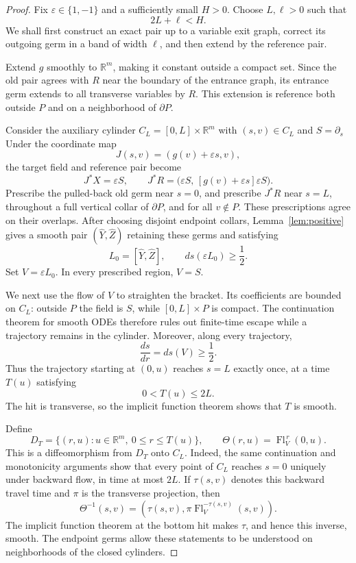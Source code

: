 \documentclass[11pt]{article}
\theoremstyle{remark}
\begin{document}
\begin{proof}
Fix $\varepsilon\in\{1,-1\}$ and a sufficiently small $H>0$. Choose $L,\ell>0$ such that
$$
    2L+\ell<H.
$$
We shall first construct an exact pair up to a variable exit graph, correct its outgoing germ in a band of width $\ell$, and then extend by the reference pair.

Extend $g$ smoothly to $\mathbb R^m$, making it constant outside a compact set. Since the old pair agrees with $R$ near the boundary of the entrance graph, its entrance germ extends to all transverse variables by $R$. This extension is reference both outside $P$ and on a neighborhood of $\partial P$.

Consider the auxiliary cylinder $C_L=[0,L]\times\mathbb R^m$ with $(s,v)\in C_L$ and $S=\partial_s$ Under the coordinate map
$$
    J(s,v)=(g(v)+\varepsilon s,v),
$$
the target field and reference pair become
$$
    J^*X=\varepsilon S,
    \qquad
    J^*R=
    \bigl(\varepsilon S,\,[g(v)+\varepsilon s]\varepsilon S\bigr).
$$
Prescribe the pulled-back old germ near $s=0$, and prescribe $J^*R$ near $s=L$, throughout a full vertical collar of $\partial P$, and for all $v\notin P$. These prescriptions agree on their overlaps. After choosing disjoint endpoint collars, Lemma~\ref{lem:positive} gives a smooth pair $(\widehat Y,\widehat Z)$ retaining these germs
and satisfying
$$
    L_0=[\widehat Y,\widehat Z],
    \qquad
    ds(\varepsilon L_0)\ge\frac12.
$$
Set $V=\varepsilon L_0$. In every prescribed region, $V=S$.

We next use the flow of $V$ to straighten the bracket. Its coefficients are bounded on $C_L$: outside $P$ the field is $S$, while $[0,L]\times P$ is compact. The continuation theorem for smooth ODEs therefore rules out finite-time escape while a trajectory remains in the cylinder. Moreover, along every trajectory,
$$
    \frac{ds}{dr}=ds(V)\ge\frac12.
$$
Thus the trajectory starting at $(0,u)$ reaches $s=L$ exactly once, at a time $T(u)$ satisfying
$$
    0<T(u)\le 2L.
$$
The hit is transverse, so the implicit function theorem shows that $T$ is smooth.

Define
$$
    D_T=
    \{(r,u):u\in\mathbb R^m,\ 0\le r\le T(u)\},
    \qquad
    \Theta(r,u)=\operatorname{Fl}_V^{\,r}(0,u).
$$
This is a diffeomorphism from $D_T$ onto $C_L$. Indeed, the same continuation and monotonicity arguments show that every point of $C_L$ reaches $s=0$ uniquely under backward flow, in time at most $2L$. If $\tau(s,v)$ denotes this backward travel time and $\pi$
is the transverse projection, then
$$
    \Theta^{-1}(s,v)
    =
    \left(
        \tau(s,v),
        \pi\operatorname{Fl}_V^{-\tau(s,v)}(s,v)
    \right).
$$
The implicit function theorem at the bottom hit makes $\tau$, and hence this inverse, smooth. The endpoint germs allow these statements to be understood on neighborhoods of the closed cylinders.


\end{proof}
\end{document}
